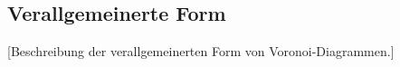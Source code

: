 \subsection{Verallgemeinerte Form}
[Beschreibung der verallgemeinerten Form von Voronoi-Diagrammen.]
